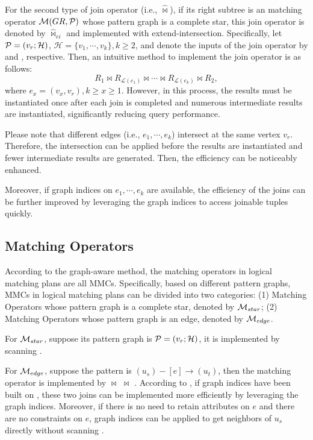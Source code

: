 For the second type of join operator (i.e., $\widehat{\Join}$), if its right subtree is an matching operator $\mathcal{M}(GR, \mathcal{P})$ whose pattern graph is a complete star, this join operator is denoted by $\widehat{\Join}_{ei}$ and implemented with extend-intersection.
Specifically, let \(\mathcal{P} = (v_r; \mathcal{H})\), $\mathcal{H} = \{v_1, \cdots, v_k\}, k \geq 2$, and denote the inputs of the join operator by  and , respective.
Then, an intuitive method to implement the join operator is as follows:
\begin{equation*}
    R_{1} \Join R_{\mathcal{L}(e_1)} \Join \cdots \Join R_{\mathcal{L}(e_k)} \Join R_{2},
\end{equation*}
where $e_x = (v_x, v_r), k \geq x \geq 1$.
However, in this process, the results must be instantiated once after each join is completed and numerous intermediate results are instantiated, significantly reducing query performance.

Please note that different edges (i.e., $e_1, \cdots, e_k$) intersect at the same vertex $v_r$.
Therefore, the intersection can be applied before the results are instantiated and fewer intermediate results are generated.
Then, the efficiency can be noticeably enhanced.

Moreover, if graph indices on $e_1, \cdots, e_k$ are available, the efficiency of the joins can be further improved by leveraging the graph indices to access joinable tuples quickly.


\subsection{Matching Operators}
\label{sec:matching-operator}
According to the graph-aware method, the matching operators in logical matching plans are all MMCs.
Specifically, based on different pattern graphs, MMCs in logical matching plans can be divided into two categories: 
(1) Matching Operators whose pattern graph is a complete star, denoted by $\mathcal{M}_{star}$;
(2) Matching Operators whose pattern graph is an edge, denoted by $\mathcal{M}_{edge}$.

For $\mathcal{M}_{star}$, suppose its pattern graph is $\mathcal{P} = (v_r; \mathcal{H})$, it is implemented by scanning .

For $\mathcal{M}_{edge}$, suppose the pattern is $(u_s) - [e] \rightarrow (u_t)$, then the matching operator is implemented by  $\Join$  $\Join$ .
According to , if graph indices have been built on , these two joins can be implemented more efficiently by leveraging the graph indices.
Moreover, if there is no need to retain attributes on $e$ and there are no constraints on $e$, graph indices can be applied to get neighbors of $u_s$ directly without scanning .

